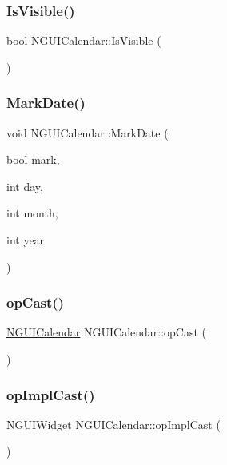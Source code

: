 \subsubsection{\texorpdfstring{Is\+Visible()}{IsVisible()}}
{\footnotesize\ttfamily bool N\+G\+U\+I\+Calendar\+::\+Is\+Visible (\begin{DoxyParamCaption}{ }\end{DoxyParamCaption})}

\hypertarget{class_n_g_u_i_calendar_a54a265f505a76f7797c10a53a1822f8f}{}\label{class_n_g_u_i_calendar_a54a265f505a76f7797c10a53a1822f8f} 
\subsubsection{\texorpdfstring{Mark\+Date()}{MarkDate()}}
{\footnotesize\ttfamily void N\+G\+U\+I\+Calendar\+::\+Mark\+Date (\begin{DoxyParamCaption}\item[{bool}]{mark,  }\item[{int}]{day,  }\item[{int}]{month,  }\item[{int}]{year }\end{DoxyParamCaption})}

\hypertarget{class_n_g_u_i_calendar_ab7f8e0c9bab98e7570fa18e3339df492}{}\label{class_n_g_u_i_calendar_ab7f8e0c9bab98e7570fa18e3339df492} 
\subsubsection{\texorpdfstring{op\+Cast()}{opCast()}}
{\footnotesize\ttfamily \hyperlink{class_n_g_u_i_calendar}{N\+G\+U\+I\+Calendar} N\+G\+U\+I\+Calendar\+::op\+Cast (\begin{DoxyParamCaption}{ }\end{DoxyParamCaption})}

\hypertarget{class_n_g_u_i_calendar_af9fa370e273ee3aa4a55bb35f65f2546}{}\label{class_n_g_u_i_calendar_af9fa370e273ee3aa4a55bb35f65f2546} 
\subsubsection{\texorpdfstring{op\+Impl\+Cast()}{opImplCast()}}
{\footnotesize\ttfamily N\+G\+U\+I\+Widget N\+G\+U\+I\+Calendar\+::op\+Impl\+Cast (\begin{DoxyParamCaption}{ }\end{DoxyParamCaption})}

